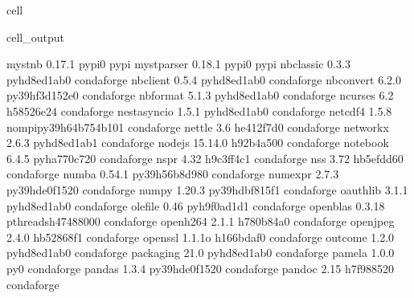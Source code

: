 \documentclass[letterpaper,table,10pt,english]{jupyterBook}
\begin{document}
\begin{sphinxuseclass}{cell}
\begin{sphinxVerbatimOutput}
\begin{sphinxuseclass}{cell_output}
\begin{sphinxVerbatim}[commandchars=\\\{\}]
myst\PYGZhy{}nb                   0.17.1                   pypi\PYGZus{}0    pypi
myst\PYGZhy{}parser               0.18.1                   pypi\PYGZus{}0    pypi
nbclassic                 0.3.3              pyhd8ed1ab\PYGZus{}0    conda\PYGZhy{}forge
nbclient                  0.5.4              pyhd8ed1ab\PYGZus{}0    conda\PYGZhy{}forge
nbconvert                 6.2.0            py39hf3d152e\PYGZus{}0    conda\PYGZhy{}forge
nbformat                  5.1.3              pyhd8ed1ab\PYGZus{}0    conda\PYGZhy{}forge
ncurses                   6.2                  h58526e2\PYGZus{}4    conda\PYGZhy{}forge
nest\PYGZhy{}asyncio              1.5.1              pyhd8ed1ab\PYGZus{}0    conda\PYGZhy{}forge
netcdf4                   1.5.8           nompi\PYGZus{}py39h64b754b\PYGZus{}101    conda\PYGZhy{}forge
nettle                    3.6                  he412f7d\PYGZus{}0    conda\PYGZhy{}forge
networkx                  2.6.3              pyhd8ed1ab\PYGZus{}1    conda\PYGZhy{}forge
nodejs                    15.14.0              h92b4a50\PYGZus{}0    conda\PYGZhy{}forge
notebook                  6.4.5              pyha770c72\PYGZus{}0    conda\PYGZhy{}forge
nspr                      4.32                 h9c3ff4c\PYGZus{}1    conda\PYGZhy{}forge
nss                       3.72                 hb5efdd6\PYGZus{}0    conda\PYGZhy{}forge
numba                     0.54.1           py39h56b8d98\PYGZus{}0    conda\PYGZhy{}forge
numexpr                   2.7.3            py39hde0f152\PYGZus{}0    conda\PYGZhy{}forge
numpy                     1.20.3           py39hdbf815f\PYGZus{}1    conda\PYGZhy{}forge
oauthlib                  3.1.1              pyhd8ed1ab\PYGZus{}0    conda\PYGZhy{}forge
olefile                   0.46               pyh9f0ad1d\PYGZus{}1    conda\PYGZhy{}forge
openblas                  0.3.18          pthreads\PYGZus{}h4748800\PYGZus{}0    conda\PYGZhy{}forge
openh264                  2.1.1                h780b84a\PYGZus{}0    conda\PYGZhy{}forge
openjpeg                  2.4.0                hb52868f\PYGZus{}1    conda\PYGZhy{}forge
openssl                   1.1.1o               h166bdaf\PYGZus{}0    conda\PYGZhy{}forge
outcome                   1.2.0              pyhd8ed1ab\PYGZus{}0    conda\PYGZhy{}forge
packaging                 21.0               pyhd8ed1ab\PYGZus{}0    conda\PYGZhy{}forge
pamela                    1.0.0                      py\PYGZus{}0    conda\PYGZhy{}forge
pandas                    1.3.4            py39hde0f152\PYGZus{}0    conda\PYGZhy{}forge
pandoc                    2.15                 h7f98852\PYGZus{}0    conda\PYGZhy{}forge

\end{sphinxVerbatim}
\end{sphinxuseclass}
\end{sphinxVerbatimOutput}
\end{sphinxuseclass}
\end{document}
